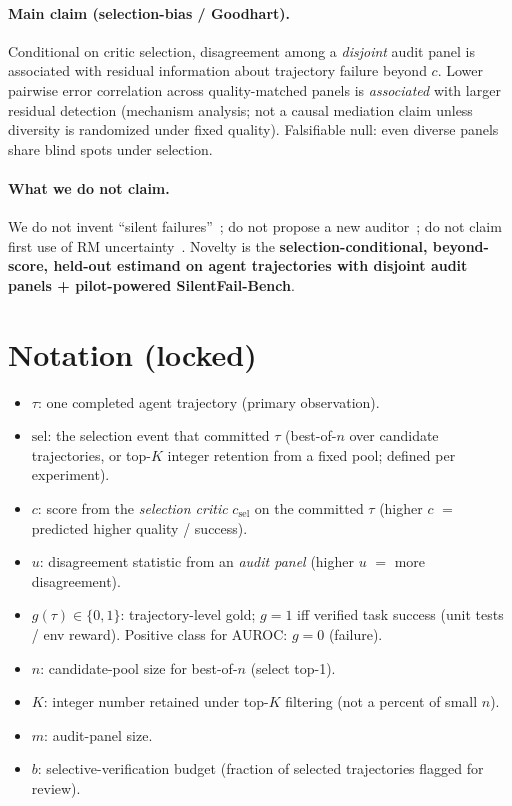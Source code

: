 \documentclass[11pt]{article}
\newcommand{\gzero}{g{=}0}
\begin{document}
\paragraph{Main claim (selection-bias / Goodhart).}
Conditional on critic selection, disagreement among a \emph{disjoint} audit panel is associated with residual information about trajectory failure beyond $c$.
Lower pairwise error correlation across quality-matched panels is \emph{associated} with larger residual detection (mechanism analysis; not a causal mediation claim unless diversity is randomized under fixed quality).
Falsifiable null: even diverse panels share blind spots under selection.

\paragraph{What we do not claim.}
We do not invent ``silent failures''~\cite{falsesuccess}; do not propose a new auditor~\cite{agentforesight}; do not claim first use of RM uncertainty~\cite{urm,coste,caution}.
Novelty is the \textbf{selection-conditional, beyond-score, held-out estimand on agent trajectories with disjoint audit panels + pilot-powered SilentFail-Bench}.

\section{Notation (locked)}

\begin{itemize}[leftmargin=*,itemsep=1pt]
  \item $\tau$: one completed agent trajectory (primary observation).
  \item $\mathrm{sel}$: the selection event that committed $\tau$ (best-of-$n$ over candidate trajectories, or top-$K$ integer retention from a fixed pool; defined per experiment).
  \item $c$: score from the \emph{selection critic} $c_{\mathrm{sel}}$ on the committed $\tau$ (higher $c$ $=$ predicted higher quality / success).
  \item $u$: disagreement statistic from an \emph{audit panel} (higher $u$ $=$ more disagreement).
  \item $g(\tau)\in\{0,1\}$: trajectory-level gold; $g{=}1$ iff verified task success (unit tests / env reward). Positive class for AUROC: $\gzero$ (failure).
  \item $n$: candidate-pool size for best-of-$n$ (select top-1).
  \item $K$: integer number retained under top-$K$ filtering (not a percent of small $n$).
  \item $m$: audit-panel size.
  \item $b$: selective-verification budget (fraction of selected trajectories flagged for review).
\end{itemize}
\end{document}
